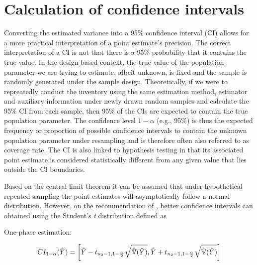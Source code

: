 \newpage




\section{Calculation of confidence intervals}
\label{sec:confint_calc}

Converting the estimated variance into a 95\% confidence interval (CI) allows for a more practical interpretation of a point estimate's precision. The correct interpretation of a CI is not that there is a 95\% probability that it contains the true value. In the design-based context, the true value of the population parameter we are trying to estimate, albeit unknown, is fixed and the sample is randomly generated under the sample design. Theoretically, if we were to repreatedly conduct the inventory using the same estimation method, estimator and auxiliary information under newly drawn random samples and calculate the 95\%  CI from each sample, then 95\% of the CIs are expected to contain the true population parameter. The confidence level $1-\alpha$ (e.g., 95\%) is thus the expected frequency or proportion of possible confidence intervals to contain the unknown population parameter under resampling and is therefore often also referred to as coverage rate. The CI is also linked to hypothesis testing in that its associated point estimate is considered statistically different from any given value that lies outside the CI boundaries.

Based on the central limit theorem it can be assumed that under hypothetical repeated sampling the point estimates will asymptotically follow a normal distribution. However, on the recommendation of \citet{mandallaz2013a}, better confidence intervals can obtained using the Student's \textit{t} distribution defined as

\vspace{4mm}

One-phase estimation:

\begin{equation}\label{ci_1phase}
CI_{1-\alpha}(\hat{Y})=\bigg{\lbrack}\hat{Y}-t_{n_{2}-1, 1-\frac{\alpha}{2}}\sqrt{\hat{\mathbb{V}}(\hat{Y})},
                              \hat{Y}+t_{n_{2}-1, 1-\frac{\alpha}{2}}\sqrt{\hat{\mathbb{V}}(\hat{Y})}\bigg{\rbrack}
\end{equation}


